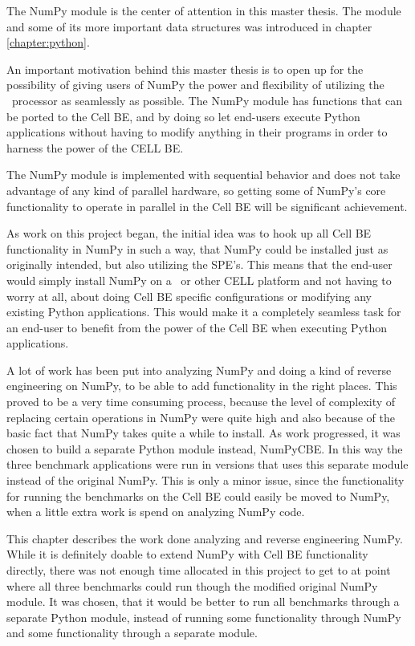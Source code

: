 The NumPy module is the center of attention in this master thesis. The
module and some of its more important data structures was introduced
in chapter \ref{chapter:python}.

An important motivation behind this master thesis is to open up for
the possibility of giving users of NumPy the power and flexibility of
utilizing the \CBE\ processor as seamlessly as possible. The NumPy
module has functions that can be ported to the Cell BE, and by doing
so let end-users execute Python applications without having to modify
anything in their programs in order to harness the power of the CELL
BE.

The NumPy module is implemented with sequential behavior and does not
take advantage of any kind of parallel hardware, so getting some of
NumPy's core functionality to operate in parallel in the Cell BE will
be significant achievement.


As work on this project began, the initial idea was to hook up all
Cell BE functionality in NumPy in such a way, that NumPy could be
installed just as originally intended, but also utilizing the 
SPE's. This means that the end-user would simply install NumPy on a
\PS\ or other CELL platform and not having to worry at all,
about doing Cell BE specific configurations or modifying any existing
Python applications. This would make it a completely seamless task
for an end-user to benefit from the power of the Cell BE when
executing Python applications.


A lot of work has been put into analyzing NumPy and doing a kind of
reverse engineering on NumPy, to be able to add functionality in the
right places. This proved to be a very time consuming process, because
the level of complexity of replacing certain operations in NumPy were
quite high and also because of the basic fact that NumPy takes quite a
while to install. As work progressed, it was chosen to build a
separate Python module instead, NumPyCBE. In this way the three
benchmark applications were run in versions that uses this separate
module instead of the original NumPy. This is only a minor issue,
since the functionality for running the benchmarks on the Cell BE
could easily be moved to NumPy, when a little extra work is spend on
analyzing NumPy code.


This chapter describes the work done analyzing and reverse engineering
NumPy. While it is definitely doable to extend NumPy with Cell BE
functionality directly, there was not enough time allocated in this
project to get to at point where all three benchmarks could run though
the modified original NumPy module. It was chosen, that it would be
better to run all benchmarks through a separate Python module, instead
of running some functionality through NumPy and some
functionality through a separate module.



